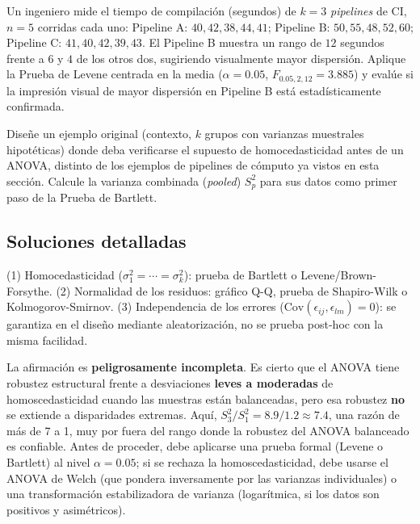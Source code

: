 \begin{problema}
	\label{prob:8dd2466}
	Un ingeniero mide el tiempo de compilación (segundos) de $k=3$ \emph{pipelines} de CI, $n=5$ corridas cada uno: Pipeline A: $40,42,38,44,41$; Pipeline B: $50,55,48,52,60$; Pipeline C: $41,40,42,39,43$. El Pipeline B muestra un rango de $12$ segundos frente a $6$ y $4$ de los otros dos, sugiriendo visualmente mayor dispersión. Aplique la Prueba de Levene centrada en la media ($\alpha=0.05$, $F_{0.05,2,12}=3.885$) y evalúe si la impresión visual de mayor dispersión en Pipeline B está estadísticamente confirmada.
\end{problema}

\begin{problema}
	\label{prob:095357b}
	Diseñe un ejemplo original (contexto, $k$ grupos con varianzas muestrales hipotéticas) donde deba verificarse el supuesto de homocedasticidad antes de un ANOVA, distinto de los ejemplos de pipelines de cómputo ya vistos en esta sección. Calcule la varianza combinada (\emph{pooled}) $S_p^2$ para sus datos como primer paso de la Prueba de Bartlett.
\end{problema}

\subsection*{Soluciones detalladas}

\begin{solproblema}[prob:aa64893]
	(1) Homocedasticidad ($\sigma_1^2=\cdots=\sigma_k^2$): prueba de Bartlett o Levene/Brown-Forsythe. (2) Normalidad de los residuos: gráfico Q-Q, prueba de Shapiro-Wilk o Kolmogorov-Smirnov. (3) Independencia de los errores ($\text{Cov}(\epsilon_{ij},\epsilon_{lm})=0$): se garantiza en el diseño mediante aleatorización, no se prueba post-hoc con la misma facilidad.
\end{solproblema}

\begin{solproblema}[prob:e34d9fb]
	La afirmación es \textbf{peligrosamente incompleta}. Es cierto que el ANOVA tiene robustez estructural frente a desviaciones \textbf{leves a moderadas} de homoscedasticidad cuando las muestras están balanceadas, pero esa robustez \textbf{no} se extiende a disparidades extremas. Aquí, $S_3^2/S_1^2 = 8.9/1.2 \approx7.4$, una razón de más de 7 a 1, muy por fuera del rango donde la robustez del ANOVA balanceado es confiable. Antes de proceder, debe aplicarse una prueba formal (Levene o Bartlett) al nivel $\alpha=0.05$; si se rechaza la homoscedasticidad, debe usarse el ANOVA de Welch (que pondera inversamente por las varianzas individuales) o una transformación estabilizadora de varianza (logarítmica, si los datos son positivos y asimétricos).
\end{solproblema}

